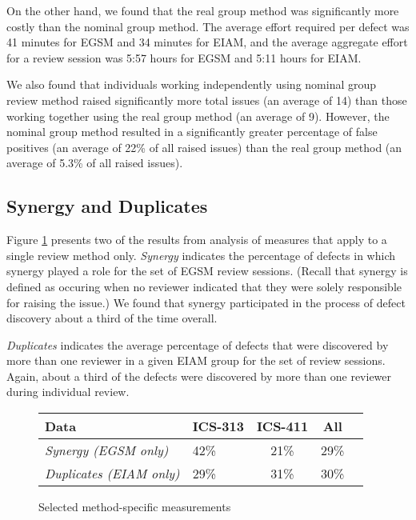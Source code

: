 On the other hand, we found that the real group method was significantly
more costly than the nominal group method.  The average effort required per
defect was 41 minutes for EGSM and 34 minutes for EIAM, and the average
aggregate effort for a review session was 5:57 hours for EGSM and 5:11
hours for EIAM.

We also found that individuals working independently using nominal group
review method raised significantly more total issues (an average of 14)
than those working together using the real group method (an average of 9).  However, the nominal group method resulted in 
a significantly greater percentage of false positives (an average of 22\% of all raised
issues) than the real group method (an average of 5.3\% of all raised issues). 

\subsection{Synergy and Duplicates}

Figure \ref{fig:individual-results} presents two of the results from
analysis of measures that apply to a single review method only.
{\em Synergy} indicates the percentage of defects in which
synergy played a role for the set of EGSM review sessions. (Recall that
synergy is defined as occuring when no reviewer indicated that they were
solely responsible for raising the issue.) We found that
synergy participated in the process of defect discovery about a third
of the time overall. 

{\em Duplicates} indicates the average percentage of defects that were
discovered by more than one reviewer in a given EIAM group for the set of
review sessions. Again, about a third of the defects were discovered by 
more than one reviewer during individual review. 

\begin{figure}[ht]
\small
  \begin{center}
  \begin{tabular}{|l|l|c|c|c|}
   \hline
Data                       & ICS-313 & ICS-411 & All \\
   \hline
{\em Synergy (EGSM only)}         & 42\%    & 21\%     & 29\% \\
{\em Duplicates (EIAM only)}      & 29\%    & 31\%     & 30\% \\
  \hline
   \end{tabular}
  \end{center}
 \caption{Selected method-specific measurements}
 \label{fig:individual-results}
\normalsize
\end{figure}

